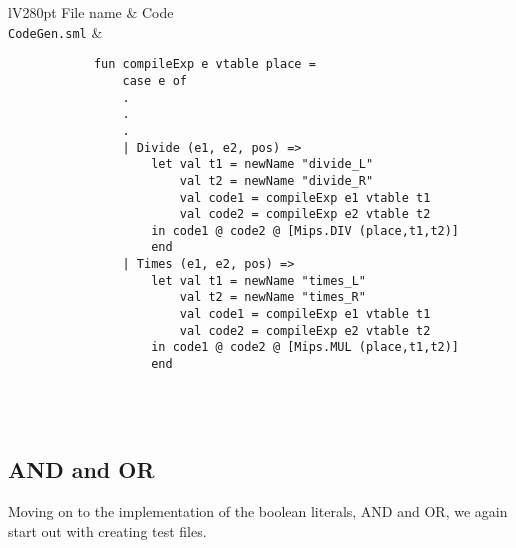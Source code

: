 \documentclass[]{article}
\newcommand{\command}[1]{\texttt{\string#1}}
\begin{document}
\begin{center}	
	\begin{tabular}{lV{280pt}}
		\toprule
		File name & Code\\
		\midrule
		\command{CodeGen.sml} &
		\begin{verbatim}
			fun compileExp e vtable place =
			    case e of
			    .
			    .
			    .
			    | Divide (e1, e2, pos) =>
			        let val t1 = newName "divide_L"
			            val t2 = newName "divide_R"
			            val code1 = compileExp e1 vtable t1
			            val code2 = compileExp e2 vtable t2
			        in code1 @ code2 @ [Mips.DIV (place,t1,t2)]
			        end
			    | Times (e1, e2, pos) =>
			        let val t1 = newName "times_L"
			            val t2 = newName "times_R"
			            val code1 = compileExp e1 vtable t1
			            val code2 = compileExp e2 vtable t2
			        in code1 @ code2 @ [Mips.MUL (place,t1,t2)]
			        end
		\end{verbatim}
		\\
		\bottomrule \\
	\end{tabular}
\end{center}

\subsection{AND and OR}
Moving on to the implementation of the boolean literals, AND and OR, we again start out with creating test files.\\
\end{document}
